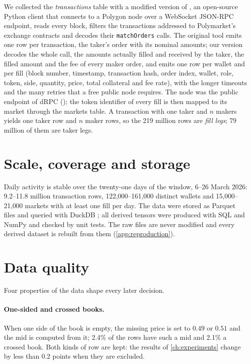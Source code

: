 We collected the \emph{transactions} table with a modified version of
 \cite{martkir2026polytradescan}, an open-source Python client that
connects to a Polygon node over a WebSocket JSON-RPC endpoint, reads every block, filters
the transactions addressed to Polymarket's exchange contracts and decodes their
\texttt{matchOrders} calls.  The original tool emits one row per transaction, the taker's
order with its nominal amounts; our version decodes the whole call, the amounts actually
filled and received by the taker, the filled amount and the fee of every maker order, and
emits one row per wallet and per fill (block number, timestamp, transaction hash, order
index, wallet, role, token, side, quantity, price, total collateral and fee rate), with
the longer timeouts and the many retries that a free public node requires.  The node was
the public endpoint of dRPC (); the token identifier of
every fill is then mapped to its market through the markets table.  A transaction with one taker and $n$ makers yields one taker row and $n$
maker rows, so the 219 million rows are \emph{fill legs}; 79 million of them are taker legs.

\section{Scale, coverage and storage}
\label{sec:data:scale}

Daily activity is stable over the twenty-one days of the window, 6--26 March 2026:
9.2--11.8 million transaction rows,
122{,}000--161{,}000 distinct wallets and 15{,}000--21{,}000 markets with at least one fill
per day.  The data were stored as Parquet files and queried with DuckDB
\cite{raasveldt2019duckdb}; all derived tensors were produced with SQL and NumPy and
checked by unit tests.  The raw files are never modified and every derived dataset is
rebuilt from them (\cref{app:reproduction}).

\section{Data quality}
\label{sec:data:quality}

Four properties of the data shape every later decision.

\paragraph{One-sided and crossed books.}  When one side of the book is empty, the
missing price is set to $0.49$ or $0.51$ and the mid is computed from it; 2.4\% of the
rows have such a mid and 2.1\% a crossed book.  Both kinds of row are kept: the results
of \cref{ch:experiments} change by less than $0.2$ points when they are excluded.

